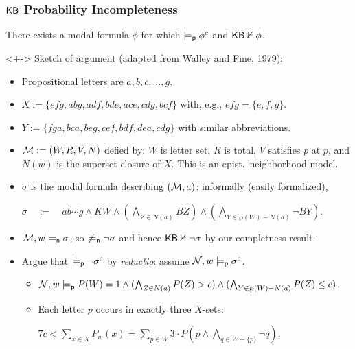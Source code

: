 \begin{frame}
  \frametitle{${\mathsf{KB}}$ Probability Incompleteness} \uncover<+->{}There
  exists a modal formula $\phi$ for which $\models_{\mathsf{p}}\phi^c$ and
  ${\mathsf{KB}}\nvdash\phi$.

  \medskip
  \begin{uncoverenv}<+->
    \footnotesize
    Sketch of argument (adapted from Walley and Fine, 1979):
    \begin{itemize}
    \item Propositional letters are $a,b,c,\dots,g$.

    \item $X := \{efg, abg, adf, bde, ace, cdg, bcf\}$ with, e.g.,
      $efg=\{e,f,g\}$.

    \item $Y := \{fga, bca, beg, cef, bdf, dea, cdg\}$ with
      similar abbreviations.
      
    \item ${\cal M}:=(W,R,V,N)$ defied by: $W$ is letter set, $R$ is total,
      $V$ satisfies $p$ at $p$, and $N(w)$ is the superset closure of
      $X$. This is an epist.~neighborhood model.

    \item $\sigma$ is the modal formula describing $({\cal M},a)$:
      informally (easily formalized),
      \begin{center}
        $\sigma \quad:=\quad a\bar{b}\cdots\bar{g} \land KW
        \land (\bigwedge_{Z\in N(a)}BZ) \land
        (\bigwedge_{Y\in\wp(W)-N(a)}\lnot BY)$\enspace.
      \end{center}

    \item ${\cal M},w\models_{\mathsf{n}}\sigma$, so $\not\models_{\mathsf{n}}\lnot\sigma$ and
      hence ${\mathsf{KB}}\nvdash\lnot\sigma$ by our completness result.

    \item Argue that $\models_{\mathsf{p}}\lnot\sigma^c$ by \emph{reductio}:
      assume ${\cal N},w\models_{\mathsf{p}}\sigma^c$.
      \begin{itemize}
        \footnotesize
      \item ${\cal N},w\models_{\mathsf{p}} P(W)=1 \land (\bigwedge_{Z\in
          N(a)}P(Z)>c)\land (\bigwedge_{Y\in\wp(W)-N(a)}P(Z)\leq c)$.

      \item Each letter $p$ occurs in exactly three $X$-sets:
        \begin{center}
          $7c<\sum_{x\in X} P_w(x) = \sum_{p\in W}3\cdot
          P\left(p\land\bigwedge_{q\in W-\{p\}}\lnot
            q\right)$\enspace.
        \end{center}


\end{itemize}
\end{itemize}
\end{uncoverenv}
\end{frame}
